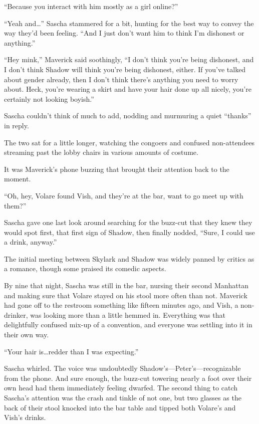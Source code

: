 ``Because you interact with him mostly as a girl online?''

``Yeah and\ldots{}'' Sascha stammered for a bit, hunting for the best way to convey the way they'd been feeling. ``And I just don't want him to think I'm dishonest or anything.''

``Hey mink,'' Maverick said soothingly, ``I don't think you're being dishonest, and I don't think Shadow will think you're being dishonest, either. If you've talked about gender already, then I don't think there's anything you need to worry about. Heck, you're wearing a skirt and have your hair done up all nicely, you're certainly not looking boyish.''

Sascha couldn't think of much to add, nodding and murmuring a quiet ``thanks'' in reply.

The two sat for a little longer, watching the congoers and confused non-attendees streaming past the lobby chairs in various amounts of costume.

It was Maverick's phone buzzing that brought their attention back to the moment.

``Oh, hey, Volare found Vish, and they're at the bar, want to go meet up with them?''

Sascha gave one last look around searching for the buzz-cut that they knew they would spot first, that first sign of Shadow, then finally nodded, ``Sure, I could use a drink, anyway.''

\secdiv{}

The initial meeting between Skylark and Shadow was widely panned by critics as a romance, though some praised its comedic aspects.

By nine that night, Sascha was still in the bar, nursing their second Manhattan and making sure that Volare stayed on his stool more often than not. Maverick had gone off to the restroom something like fifteen minutes ago, and Vish, a non-drinker, was looking more than a little hemmed in. Everything was that delightfully confused mix-up of a convention, and everyone was settling into it in their own way.

``Your hair is\ldots{}redder than I was expecting.''

Sascha whirled. The voice was undoubtedly Shadow's---Peter's---recognizable from the phone. And sure enough, the buzz-cut towering nearly a foot over their own head had them immediately feeling dwarfed. The second thing to catch Sascha's attention was the crash and tinkle of not one, but two glasses as the back of their stool knocked into the bar table and tipped both Volare's and Vish's drinks.

